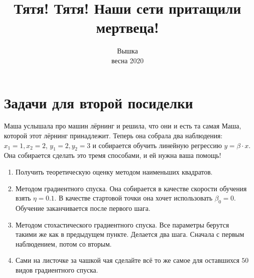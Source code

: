 \documentclass[12pt, a4paper, oneside]{article}
\title{Тятя! Тятя! Наши сети притащили мертвеца!}
\date{Вышка \\ весна 2020}
\author{ }
\newcounter{problem}
\renewcommand{\theproblem}{\arabic{problem}}
\newcommand{\problemname}{Задача}
\newenvironment{problem}{
	\addtocounter{problem}{1}\noindent{ \color{myblue} \large\bfseries \problemname{} \theproblem \newline }
}{
	\par\bigskip
}
\begin{document}
	
	\maketitle
	
\section*{Задачи для второй посиделки} 

\begin{problem}
	Маша услышала про машин лёрнинг и решила, что они и есть та самая Маша, которой этот лёрнинг принадлежит. Теперь она собрала два наблюдения: $x_1 = 1, x_2 = 2$, $y_1 = 2, y_2 = 3$ и собирается обучить линейную регрессию $y = \beta \cdot x$.  Она собирается сделать это тремя способами, и ей нужна ваша помощь!
	
	\begin{enumerate}
		\item  Получить теоретическую оценку методом наименьших квадратов.
		
		\item  Методом градиентного спуска. Она собирается в качестве скорости обучения взять $\eta = 0.1$.  В качестве стартовой точки она хочет использовать $\beta_0 = 0$. Обучение заканчивается после первого шага.  
		
		\item Методом стохастического градиентного спуска. Все параметры берутся такими же как в предыдущем пункте. Делается два шага. Сначала с первым наблюдением, потом со вторым.
		
		\item Сами на листочке за чашкой чая сделайте всё то же самое для оставшихся $50$ видов градиентного спуска. 
	\end{enumerate}
\end{problem}
\end{document}
